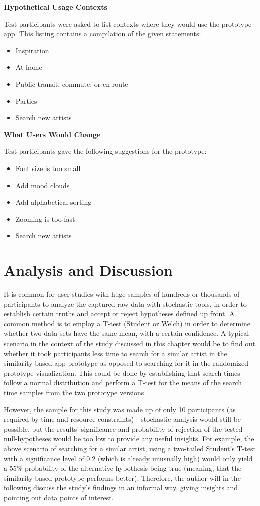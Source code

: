 \textbf{Hypothetical Usage Contexts}

Test participants were asked to list contexts where they would use the prototype app. This listing contains a compilation of the given statements:

\begin{itemize}
	\item Inspiration
	\item At home
	\item Public transit, commute, or en route
	\item Parties
	\item Search new artists
\end{itemize}

\textbf{What Users Would Change}

Test participants gave the following suggestions for the prototype:

\begin{itemize}
	\item Font size is too small
	\item Add mood clouds
	\item Add alphabetical sorting
	\item Zooming is too fast
	\item Search new artists
\end{itemize}

\section{Analysis and Discussion}

It is common for user studies with huge samples of hundreds or thousands of participants to analyze the captured raw data with stochastic tools, in order to establish certain truths and accept or reject hypotheses defined up front. A common method is to employ a T-test (Student or Welch) in order to determine whether two data sets have the same mean, with a certain confidence. A typical scenario in the context of the study discussed in this chapter would be to find out whether it took participants less time to search for a similar artist in the similarity-based app prototype as opposed to searching for it in the randomized prototype visualization. This could be done by establishing that search times follow a normal distribution and perform a T-test for the means of the search time samples from the two prototype versions.

However, the sample for this study was made up of only 10 participants (as required by time and resource constraints) - stochastic analysis would still be possible, but the results' significance and probability of rejection of the tested null-hypotheses would be too low to provide any useful insights. For example, the above scenario of searching for a similar artist, using a two-tailed Student's T-test with a significance level of 0.2 (which is already unusually high) would only yield a 55\% probability of the alternative hypothesis being true (meaning, that the similarity-based prototype performs better). Therefore, the author will in the following discuss the study's findings in an informal way, giving insights and pointing out data points of interest.


